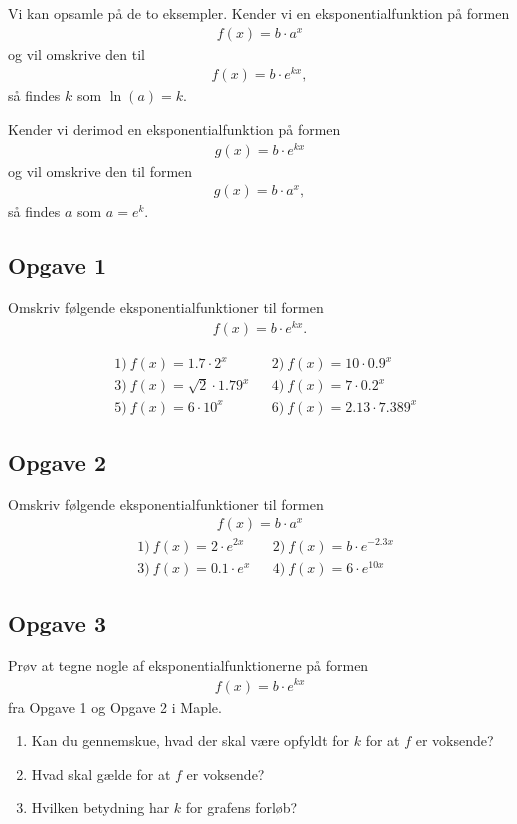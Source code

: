Vi kan opsamle på de to eksempler. Kender vi en eksponentialfunktion på formen 
\begin{align*}
	f(x) = b\cdot a^x
\end{align*}
og vil omskrive den til 
\begin{align*}
	f(x) = b\cdot e^{kx}, 
\end{align*}
så findes $k$ som $\ln(a) = k$.

Kender vi derimod en eksponentialfunktion på formen
\begin{align*}
	g(x) = b \cdot e^{kx}
\end{align*}
og vil omskrive den til formen
\begin{align*}
	g(x) = b \cdot a^x,
\end{align*}
så findes $a$ som $a = e^k$.

\subsection*{Opgave 1}
Omskriv følgende eksponentialfunktioner til formen
\begin{align*}
	f(x) = b \cdot e^{kx}.
\end{align*}

\begin{align*}
	&1) \ f(x) = 1.7\cdot 2^x   &   &2) \ f(x) = 10 \cdot 0.9^x   \\
	&3) \ f(x) = \sqrt{2}\cdot 1.79^x  &   &4) \ f(x) = 7\cdot 0.2^x   \\
	&5) \ f(x) = 6\cdot 10^x  &   &6) \ f(x) = 2.13\cdot 7.389^x   
\end{align*}

\subsection*{Opgave 2}
Omskriv følgende eksponentialfunktioner til formen 
\begin{align*}
	f(x) = b \cdot a^x
\end{align*}
\begin{align*}
	&1) \ f(x) = 2\cdot e^{2x}   &   &2) \ f(x) = b\cdot e^{-2.3x}  \\
	&3) \ f(x) = 0.1\cdot e^{x}  &   &4) \ f(x) = 6\cdot e^{10x}   
\end{align*}

\subsection*{Opgave 3}
Prøv at tegne nogle af eksponentialfunktionerne på formen 
\begin{align*}
	f(x) = b\cdot e^{kx}
\end{align*}
fra Opgave 1 og Opgave 2 i Maple.
\begin{enumerate}[label=\roman*)]
	\item Kan du gennemskue, hvad der skal være opfyldt for $k$ for at $f$ er voksende?
	\item Hvad skal gælde for at $f$ er voksende?
	\item Hvilken betydning har $k$ for grafens forløb?
\end{enumerate}

